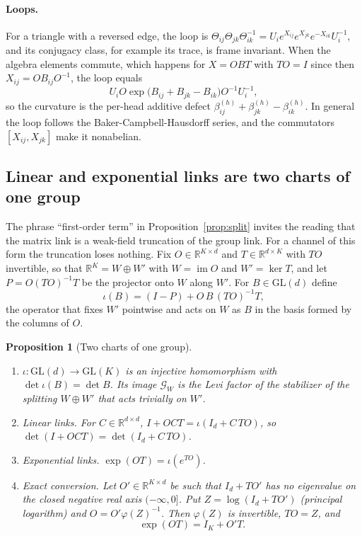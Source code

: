 \documentclass[11pt]{article}
\newtheorem{proposition}{Proposition}
\theoremstyle{definition}
\theoremstyle{remark}
\newcommand{\GL}{\mathrm{GL}}
\newcommand{\im}{\operatorname{im}}
\begin{document}
\paragraph{Loops.}
For a triangle with a reversed edge, the loop is $\Theta_{ij}\Theta_{jk}\Theta_{ik}^{-1}=U_ie^{X_{ij}}e^{X_{jk}}e^{-X_{ik}}U_i^{-1}$, and its conjugacy class, for example its trace, is frame invariant. When the algebra elements commute, which happens for $X=OB T$ with $TO=I$ since then $X_{ij}=OB_{ij}O^{-1}$, the loop equals
\begin{equation}
U_iO\exp\big(B_{ij}+B_{jk}-B_{ik}\big)O^{-1}U_i^{-1},
\label{eq:exp_loop}
\end{equation}
so the curvature is the per-head additive defect $\beta_{ij}^{(h)}+\beta_{jk}^{(h)}-\beta_{ik}^{(h)}$. In general the loop follows the Baker-Campbell-Hausdorff series, and the commutators $[X_{ij},X_{jk}]$ make it nonabelian.

\subsection{Linear and exponential links are two charts of one group}
\label{sec:charts}

The phrase ``first-order term'' in Proposition~\ref{prop:split} invites the reading that the matrix link is a weak-field truncation of the group link. For a channel of this form the truncation loses nothing. Fix $O\in\mathbb R^{K\times d}$ and $T\in\mathbb R^{d\times K}$ with $TO$ invertible, so that $\mathbb R^K=W\oplus W'$ with $W=\im O$ and $W'=\ker T$, and let $P=O(TO)^{-1}T$ be the projector onto $W$ along $W'$. For $B\in\GL(d)$ define
\begin{equation}
\iota(B)=(I-P)+O\,B\,(TO)^{-1}T,
\label{eq:embed}
\end{equation}
the operator that fixes $W'$ pointwise and acts on $W$ as $B$ in the basis formed by the columns of $O$.

\begin{proposition}[Two charts of one group]
\label{prop:charts}
\begin{enumerate}
\item $\iota:\GL(d)\to\GL(K)$ is an injective homomorphism with $\det\iota(B)=\det B$. Its image $\mathcal G_W$ is the Levi factor of the stabilizer of the splitting $W\oplus W'$ that acts trivially on $W'$.
\item \emph{Linear links.} For $C\in\mathbb R^{d\times d}$, $I+OCT=\iota(I_d+C\,TO)$, so $\det(I+OCT)=\det(I_d+C\,TO)$.
\item \emph{Exponential links.} $\exp(OT)=\iota(e^{TO})$.
\item \emph{Exact conversion.} Let $O'\in\mathbb R^{K\times d}$ be such that $I_d+TO'$ has no eigenvalue on the closed negative real axis $(-\infty,0]$. Put $Z=\log(I_d+TO')$ (principal logarithm) and $O=O'\varphi(Z)^{-1}$. Then $\varphi(Z)$ is invertible, $TO=Z$, and
\begin{equation}
\exp(OT)=I_K+O'T.
\label{eq:conversion}
\end{equation}
\end{enumerate}
\end{proposition}
\end{document}
